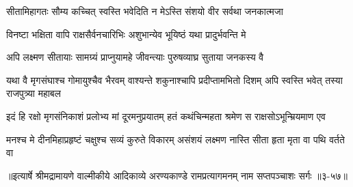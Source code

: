 \twolineshloka
{सीतामिहागतः सौम्य कच्चित् स्वस्ति भवेदिति}
{न मेऽस्ति संशयो वीर सर्वथा जनकात्मजा} %

\twolineshloka
{विनष्टा भक्षिता वापि राक्षसैर्वनचारिभिः}
{अशुभान्येव भूयिष्ठं यथा प्रादुर्भवन्ति मे} %

\twolineshloka
{अपि लक्ष्मण सीतायाः सामग्र्यं प्राप्नुयामहे}
{जीवन्त्याः पुरुषव्याघ्र सुताया जनकस्य वै} %

\threelineshloka
{यथा वै मृगसंघाश्च गोमायुश्चैव भैरवम्}
{वाश्यन्ते शकुनाश्चापि प्रदीप्तामभितो दिशम्}
{अपि स्वस्ति भवेत् तस्या राजपुत्र्या महाबल} %

\twolineshloka
{इदं हि रक्षो मृगसंनिकाशं प्रलोभ्य मां दूरमनुप्रयातम्}
{हतं कथंचिन्महता श्रमेण स राक्षसोऽभून्म्रियमाण एव} %

\twolineshloka
{मनश्च मे दीनमिहाप्रहृष्टं चक्षुश्च सव्यं कुरुते विकारम्}
{असंशयं लक्ष्मण नास्ति सीता हृता मृता वा पथि वर्तते वा} %


॥इत्यार्षे श्रीमद्रामायणे वाल्मीकीये आदिकाव्ये अरण्यकाण्डे रामप्रत्यागमनम् नाम सप्तपञ्चाशः सर्गः ॥३-५७॥
